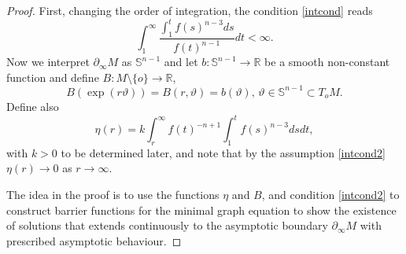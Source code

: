 \documentclass[10pt,a4paper,reqno]{amsart}
\newcommand{\R}{\mathbb{R}}
\newcommand{\Ss}{\mathbb{S}}
\newcommand{\pinf}{\partial_{\infty}}
\numberwithin{equation}{section}
\theoremstyle{plain}
\theoremstyle{definition}
\begin{document}
\begin{proof}
First, changing the order of integration, the condition \eqref{intcond} reads
        \begin{equation}\label{intcond2}
                \int_1^\infty \frac{\int_1^t f(s)^{n-3} ds}{f(t)^{n-1}} dt <\infty.
        \end{equation}
Now we interpret $\pinf M$ as $\Ss^{n-1}$ and let $b\colon \Ss^{n-1} \to \R$ be a smooth non-constant
function and define $B\colon M \setminus\{o\} \to \R$,
\[
 B(\exp(r\vartheta))=B(r,\vartheta) = b(\vartheta), \, \vartheta \in \Ss^{n-1}\subset T_oM.
 \] 
 Define also
        \[
                \eta(r) = k \int_r^\infty f(t)^{-n+1} \int_1^t f(s)^{n-3} ds dt,
        \]
with $k>0$ to be determined later, and note that by the assumption \eqref{intcond2} $\eta(r) \to 0$ as $r\to\infty$.


The idea in the proof is to use the functions $\eta$ and $B$, and condition \eqref{intcond2} to construct
barrier functions for the minimal graph equation to show the existence of solutions that extends continuously to the 
asymptotic boundary $\pinf M$ with prescribed asymptotic behaviour.


\end{proof}
\end{document}
